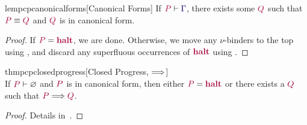 \documentclass[main.tex]{subfiles}
\begin{document}
\begin{restatablelemma}{lempcpcanonicalforms}[Canonical Forms]
  \label{lem:pcp-canonical-forms}
  If $\seq{P}{\ty{\Gamma}}$, there exists some $\tm{Q}$ such that $\tm{P}\equiv\tm{Q}$ and $\tm{Q}$ is in canonical form.
\end{restatablelemma}
\begin{proof}
  If $\tm{P}=\tm{\halt}$, we are done. Otherwise, we move any $\nu$-binders to the top using , and discard any superfluous occurrences of $\tm{\halt}$ using .
\end{proof}
\begin{restatabletheorem}{thmpcpclosedprogress}[Closed Progress, $\Longrightarrow$]
  \label{thm:pcp-closed-progress}
  \hfill\\%
  If $\seq{P}{\emptyenv}$ and $\tm{P}$ is in canonical form, then either $\tm{P}=\tm{\halt}$ or there exists a $\tm{Q}$ such that $\tm{P}\red\tm{Q}$.
\end{restatabletheorem}
\begin{proof}
  Details in~.
\end{proof}
\end{document}
